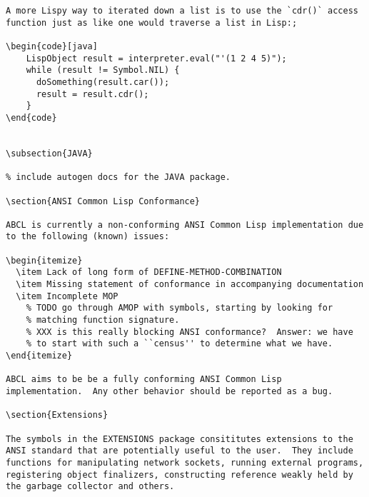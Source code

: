 \begin{lstlisting}
A more Lispy way to iterated down a list is to use the `cdr()` access
function just as like one would traverse a list in Lisp:;

\begin{code}[java]
    LispObject result = interpreter.eval("'(1 2 4 5)");
    while (result != Symbol.NIL) {
      doSomething(result.car());
      result = result.cdr();
    }
\end{code}


\subsection{JAVA}

% include autogen docs for the JAVA package.

\section{ANSI Common Lisp Conformance}

ABCL is currently a non-conforming ANSI Common Lisp implementation due
to the following (known) issues:

\begin{itemize}
  \item Lack of long form of DEFINE-METHOD-COMBINATION
  \item Missing statement of conformance in accompanying documentation
  \item Incomplete MOP 
    % TODO go through AMOP with symbols, starting by looking for
    % matching function signature.
    % XXX is this really blocking ANSI conformance?  Answer: we have
    % to start with such a ``census'' to determine what we have.
\end{itemize}

ABCL aims to be be a fully conforming ANSI Common Lisp
implementation.  Any other behavior should be reported as a bug.

\section{Extensions}

The symbols in the EXTENSIONS package consititutes extensions to the
ANSI standard that are potentially useful to the user.  They include
functions for manipulating network sockets, running external programs,
registering object finalizers, constructing reference weakly held by
the garbage collector and others.




\end{lstlisting}
